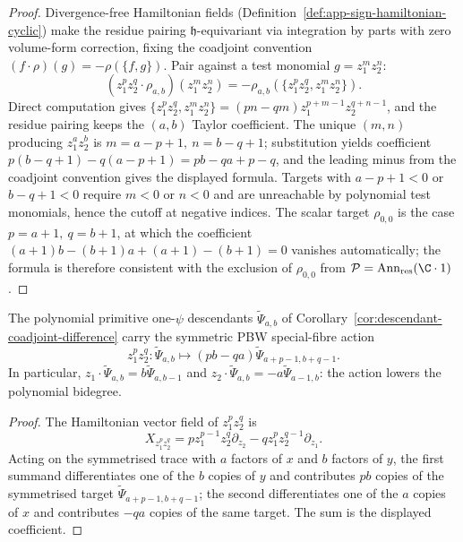 \begin{proof}
  Divergence-free Hamiltonian fields
  (Definition~\ref{def:app-sign-hamiltonian-cyclic}) make the residue
  pairing \(\mathfrak h\)-equivariant via integration by parts with zero
  volume-form correction, fixing the coadjoint convention
  \((f\cdot\rho)(g)=-\rho(\{f,g\})\).  Pair against a test
  monomial \(g=z_1^mz_2^n\):
  \[
    (z_1^pz_2^q\cdot\rho_{a,b})(z_1^mz_2^n)
      =-\rho_{a,b}(\{z_1^pz_2^q,z_1^mz_2^n\}).
  \]
  Direct computation gives
  \(\{z_1^pz_2^q,z_1^mz_2^n\}=(pn-qm)z_1^{p+m-1}z_2^{q+n-1}\), and the
  residue pairing keeps the \((a,b)\) Taylor coefficient.  The unique
  \((m,n)\) producing \(z_1^az_2^b\) is \(m=a-p+1,\ n=b-q+1\);
  substitution yields coefficient
  \(p(b-q+1)-q(a-p+1)=pb-qa+p-q\), and the leading minus from the
  coadjoint convention gives the displayed formula.  Targets with
  \(a-p+1<0\) or \(b-q+1<0\) require \(m<0\) or \(n<0\) and are
  unreachable by polynomial test monomials, hence the cutoff at
  negative indices.  The scalar target \(\rho_{0,0}\) is the case
  \(p=a+1,\ q=b+1\), at which the coefficient
  \((a+1)b-(b+1)a+(a+1)-(b+1)=0\) vanishes automatically; the formula
  is therefore consistent with the exclusion of \(\rho_{0,0}\) from
  \(\mathcal P=\operatorname{Ann}_{\mathrm{res}}(\C\cdot1)\).
\end{proof}

\begin{lem}
\label{lem:app-sign-pbw-descendant}
  The polynomial primitive one-\(\psi\) descendants
  \(\widetilde\Psi_{a,b}\) of
  Corollary~\ref{cor:descendant-coadjoint-difference} carry the
  symmetric PBW special-fibre action
  \[
    z_1^pz_2^q:\widetilde\Psi_{a,b}
      \longmapsto
      (pb-qa)\widetilde\Psi_{a+p-1,b+q-1}.
  \]
  In particular,
  \(z_1\cdot\widetilde\Psi_{a,b}=b\widetilde\Psi_{a,b-1}\) and
  \(z_2\cdot\widetilde\Psi_{a,b}=-a\widetilde\Psi_{a-1,b}\): the action
  lowers the polynomial bidegree.
\end{lem}

\begin{proof}
  The Hamiltonian vector field of \(z_1^pz_2^q\) is
  \[
    X_{z_1^pz_2^q}=pz_1^{p-1}z_2^q\partial_{z_2}
                  -qz_1^pz_2^{q-1}\partial_{z_1}.
  \]
  Acting on the symmetrised trace with \(a\) factors of \(x\) and
  \(b\) factors of \(y\), the first summand differentiates one of the
  \(b\) copies of \(y\) and contributes \(pb\) copies of the
  symmetrised target \(\widetilde\Psi_{a+p-1,b+q-1}\); the second
  differentiates one of the \(a\) copies of \(x\) and contributes
  \(-qa\) copies of the same target.  The sum is the displayed
  coefficient.
\end{proof}

